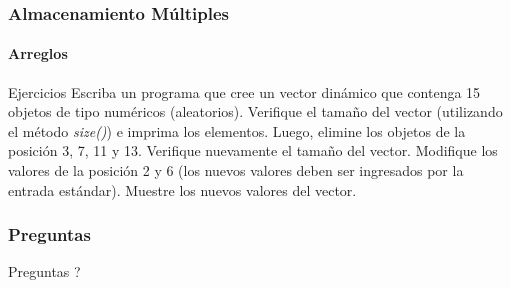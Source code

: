 \documentclass{beamer}
\begin{document}
        \begin{frame}
			\frametitle{Almacenamiento M\'ultiples}
			\framesubtitle{Arreglos}

			\begin{exampleblock}{Ejercicios}
			    {\scriptsize
				    Escriba un programa que cree un vector din\'amico que contenga 15 objetos de tipo num\'ericos (aleatorios). Verifique el tama\~no del vector (utilizando el m\'etodo \emph{size()}) e imprima los elementos. Luego, elimine los objetos de la posici\'on 3, 7, 11 y 13. Verifique nuevamente el tama\~no del vector. Modifique los valores de la posici\'on 2 y 6 (los nuevos valores deben ser ingresados por la entrada est\'andar). Muestre los nuevos valores del vector.                    
			    }
			\end{exampleblock}
		\end{frame}


			
		\begin{frame}
			\frametitle{Preguntas}

			\hspace{4cm}\huge{Preguntas ?}
		
		\end{frame}
	
\end{document}
